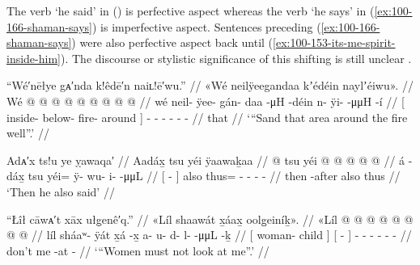 The verb  ‘he said’ in (\lastx) is perfective aspect whereas the verb  ‘he says’ in (\ref{ex:100-166-shaman-says}) is imperfective aspect.
Sentences preceding (\ref{ex:100-166-shaman-says}) were also perfective aspect back until (\ref{ex:100-153-its-me-spirit-inside-him}).
The discourse or stylistic significance of this shifting is still unclear \parencite[cf.][]{dauenhauer:2012}.

\ex\label{ex:100-172-sand-around-fire}%
%
\begingl
	\glpreamble	“Wé′nēłye gᴀ′nda k!êdē′n naiʟ!ē′wu.” //
	\glpreamble	«\!Wé neilÿeegandaa kʼédéin naylʼéiwu\!». //
	\gla	{} Wé  @ {} @ {} @ {} {}
		 @ {} @ {}
		 @ {} @ {} @ {} @ {} //
	\glb	{} wé neil- ÿee- gán- daa {} 
		 -μH -déin
		n- ÿi-   -μμH -í //
	\glc	{}[  inside- below- fire- around {}]
		 - -
		- -  - - //
	\gld	{} that  {} {} {} {}
		 {} {}
		 {} {} {} //
	\glft	‘“Sand that area around the fire well”.’
		//
\endgl
\xe

\ex\label{ex:100-173-also-said}%
%
\begingl
	\glpreamble	Adᴀ′x ts!u ye ỵawaqa′ //
	\glpreamble	Aadáx̱ tsu yéi ÿaawaḵaa //
	\gla	{}  @ {} {}
		tsu
		yéi @  @ {} @ {} @ {} @ {} //
	\glb	{} á -dáx̱ {} 
		tsu
		yéi= ÿ- wu- i-  -μμL //
	\glc	{}[  - {}]
		also
		thus= - - -  - //
	\gld	{} then -after {}
		also
		thus  {} {} {} {} //
	\glft	‘Then he also said’
		//
\endgl
\xe

\ex\label{ex:100-174-also-said}%
%
\begingl
	\glpreamble	“Łîł cāwᴀ′t xāx ułg̣enê′q.” //
	\glpreamble	«\!Líl shaawát x̱áax̱ oolg̱einíḵ\!». //
	\gla	«\!Líl 
		{}  @ {} {} 
		{}  @ {} {}
		 @ {} @ {} @ {} @ {} @ {} @ {} //
	\glb	\pqp{}líl
		{} sháaʷ- ÿát {} 
		{} x̱á -x̱ {} 
		a- u- d- l-  -μμL -ḵ  //
	\glc	\pqp{}
		{}[ woman- child {}]
		{}[  - {}]
		- - - -  - - //
	\gld	\pqp{}don’t
		{}  {} {}
		{} me -at {}
		 {} {} {} {} {} - //
	\glft	‘“Women must not look at me”.’
		//
\endgl
\xe

